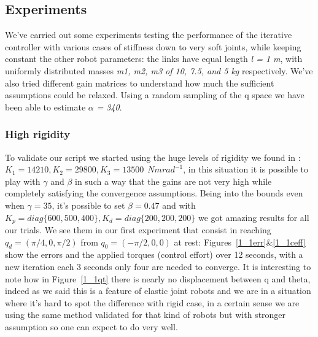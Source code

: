 \subsection{Experiments}
We've carried out some experiments testing the performance of the iterative controller with various cases of stiffness down to very soft joints, while keeping constant the other robot parameters: the links have equal length \textit{l = 1 m}, with uniformly distributed masses \textit{m1, m2, m3 of 10, 7.5, and 5 kg} respectively. We've also tried different gain matrices to understand how much the sufficient assumptions could be relaxed. Using a random sampling of the q space we have been able to estimate $\alpha$ \textit{= 340}.
\subsubsection{High rigidity}
To validate our script we started using the huge levels of rigidity we found in \cite{simplepd}: $K_1 = 14210, K_2 = 29800, K_3 = 13500 ~~Nmrad^{-1}$, in this situation it is possible to play with $\gamma$ and $\beta $ in such a way that the gains are not very high while completely satisfying the convergence assumptions. Being into the bounds even when $\gamma = 35$, it's possible to set $\beta = 0.47$ and with $K_p = diag\{600, 500, 400\},  K_d=diag\{200,200,200\}$ we got amazing results for all our trials. We see them in our first experiment that consist in reaching $q_d=(\pi/4,0,\pi/2)$ from $q_0=(-\pi/2,0,0)$ at rest: Figures~\ref{1_1err}\&\ref{1_1ceff} show the errors and the applied torques (control effort) over 12 seconds, with a new iteration each 3 seconds only four are needed to converge. It is interesting to note how in Figure~\ref{1_1qt} there is nearly no displacement between q and theta, indeed as we said this is a feature of elastic joint robots and we are in a situation where it's hard to spot the difference with rigid case, in a certain sense we are using the same method validated for that kind of robots but with stronger assumption so one can expect to do very well.
